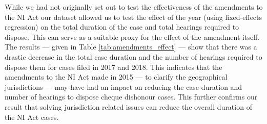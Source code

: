 While we had not originally set out to test the effectiveness of the amendments to the NI Act our dataset allowed us to test the effect of the year (using fixed-effects regression) on the total duration of the case and total hearings required to dispose. This can serve as a suitable proxy for the effect of the amendment itself. The results --- given in Table \ref{tab:amendments_effect} --- show that there was a drastic decrease in the total case duration and the number of hearings required to dispose them for cases filed in 2017 and 2018. This indicates that the amendments to the NI Act made in 2015 --- to clarify the geographical jurisdictions --- may have had an impact on reducing the case duration and number of hearings to dispose cheque dishonour cases. This further confirms our result that solving jurisdiction related issues can reduce the overall duration of the NI Act cases.

